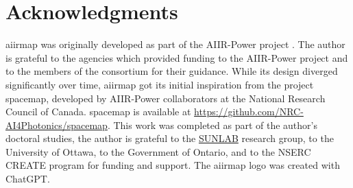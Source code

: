 \documentclass[a4paper,12pt,english]{article}
\begin{document}
    \section{Acknowledgments} \label{ack}
    aiirmap was originally developed as part of the AIIR-Power project \cite{AP_can, AP_ger}. The author is grateful to the agencies which provided funding to the AIIR-Power project and to the members of the consortium for their guidance. While its design diverged significantly over time, aiirmap got its initial inspiration from the project spacemap, developed by AIIR-Power collaborators at the National Research Council of Canada. spacemap is available at \url{https://github.com/NRC-AI4Photonics/spacemap}. This work was completed as part of the author's doctoral studies, the author is grateful to the \href{https://sunlab.ca/}{SUNLAB} research group, to the University of Ottawa, to the Government of Ontario, and to the NSERC CREATE program for funding and support. The aiirmap logo was created with ChatGPT. \\
    

    
    \printbibliography[heading=bibintoc]
\end{document}
